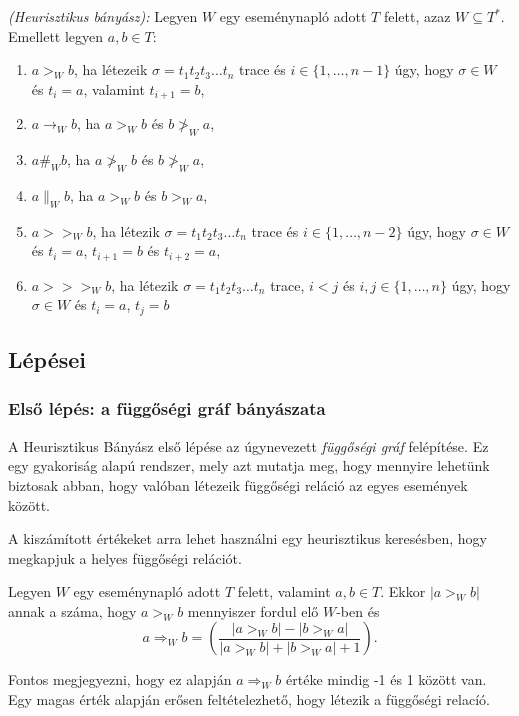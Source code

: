 \begin{definition}{\textit{(Heurisztikus bányász):}} Legyen $W$ egy eseménynapló adott $T$ felett, azaz $W \subseteq T^*$. Emellett legyen $a,b \in T:$
\begin{enumerate}

\item $ a>_W b $, ha létezeik $\sigma = t_1 t_2 t_3 \ldots t_n $ trace és $i \in \{1, \ldots ,n-1\}$ úgy, hogy $\sigma \in W$ és $t_i=a$, valamint $t_{i+1}=b$,
\item $ a \rightarrow_W b $, ha $a>_W b$ és $b\ngtr_W a$, 
\item $ a\#_Wb $, ha $a \ngtr_W b$ és $b\ngtr_W a$,
\item $a\parallel_Wb $, ha $a>_W b$ és $b>_Wa$,
\item $a >>_Wb$, ha létezik $\sigma = t_1 t_2 t_3 \ldots t_n $ trace és $i \in \{1, \ldots ,n-2\}$ úgy, hogy $\sigma \in W$ és $t_i=a$, $t_{i+1}=b$ és $t_{i+2}=a$,
\item $a>>>_Wb$, ha létezik $\sigma = t_1 t_2 t_3 \ldots t_n $ trace, $i<j$ és $i,j \in \{1,\ldots,n\}$ úgy, hogy $\sigma \in W$ és $t_i=a$, $t_j=b$

\end{enumerate}
\end{definition}

\subsection{Lépései}

\subsubsection{Első lépés: a függőségi gráf bányászata}

 A Heurisztikus Bányász első lépése az úgynevezett \textit{függőségi gráf} felépítése. Ez egy gyakoriság alapú rendszer, mely azt mutatja meg, hogy mennyire lehetünk biztosak abban, hogy valóban létezeik függőségi reláció az egyes események között.

A kiszámított értékeket arra lehet használni egy heurisztikus keresésben, hogy megkapjuk a helyes függőségi relációt.

Legyen $W$ egy eseménynapló adott $T$ felett, valamint $a,b \in T$. Ekkor $|a>_W b|$ annak a száma, hogy $a>_Wb$ mennyiszer fordul elő $W$-ben és
\[
a \Rightarrow_W b = \left(\frac{|a>_Wb|-|b>_Wa|}{|a>_Wb|+|b>_Wa|+1}\right).
\]

Fontos megjegyezni, hogy ez alapján $a\Rightarrow_Wb$ értéke mindig -1 és 1 között van. Egy magas érték alapján erősen feltételezhető, hogy létezik a függőségi relacíó.

